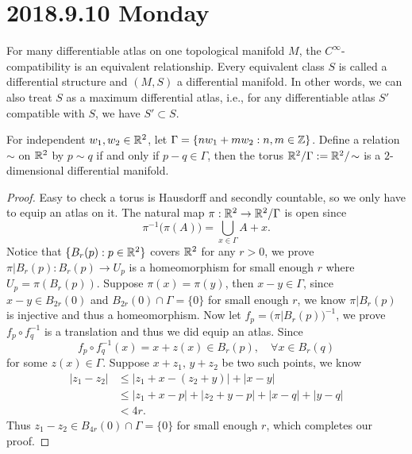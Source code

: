 \section{2018.9.10 Monday}
\begin{defi}
	For many differentiable atlas on one topological manifold $M$, the $C^\infty$-compatibility
	is an equivalent relationship. Every equivalent class $S$ is called a differential structure
	and $(M,S)$ a differential manifold. In other words, we can also treat $S$ as a maximum differential
	atlas, i.e., for any differentiable atlas $S'$ compatible with $S$, we have $S'\subset S$.
\end{defi}
\begin{ex}[Torus]
	For independent $w_1,w_2\in\mathbb{R}^2$, let $\Gamma=\{nw_1+mw_2: n,m\in\mathbb{Z}\}$. Define a relation $\sim$ on
	$\mathbb{R}^2$ by $p\sim q$ if and only if $p-q\in \Gamma$, then the torus $\mathbb{R}^2/\Gamma:=\mathbb{R}^2/\!\sim$ is a $2$-dimensional differential manifold.
\end{ex}
\begin{proof}
	Easy to check a torus is Hausdorff and secondly countable, so we only have to equip an atlas on it. The natural map $\pi:\mathbb{R}^2\to\mathbb{R}^2/\Gamma$ is open since
	\[\pi^{-1}\big(\pi(A)\big)=\bigcup_{x\in \Gamma} A+x.\]
	Notice that $\{B_r(p):p\in\mathbb{R}^2\}$ covers $\mathbb{R}^2$ for any $r>0$, we prove $\pi|B_r(p): B_r(p)\to U_p$
	is a homeomorphism for small enough $r$ where $U_p=\pi(B_r(p))$. Suppose $\pi(x)=\pi(y)$, then $x-y\in \Gamma$, since $x-y\in B_{2r}(0)$ and $B_{2r}(0)\cap \Gamma=\{0\}$ for small enough $r$, we know $\pi|B_r(p)$ is injective and thus a homeomorphism. Now let $f_p=\big(\pi|B_r(p)\big)^{-1}$, we prove $f_p\circ f_q^{-1}$ is a translation and thus we did equip an atlas. Since
	\[f_p\circ f_q^{-1}(x)=x+z(x)\in B_r(p),\quad \forall x\in B_r(q)\]
	for some $z(x)\in \Gamma$. Suppose $x+z_1,\,y+z_2$ be two such points, we know
	\begin{align*}
		|z_1-z_2|&\leq \big|z_1+x-(z_2+y)\big|+|x-y|\\
				 &\leq |z_1+x-p|+|z_2+y-p|+|x-q|+|y-q|\\
				 &<4r.
	\end{align*}
	Thus $z_1-z_2\in B_{4r}(0)\cap \Gamma=\{0\}$ for small enough $r$, which completes our proof.
\end{proof}